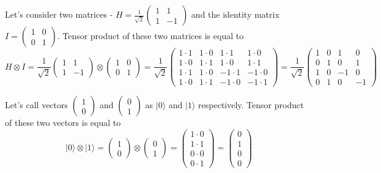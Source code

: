 \begin{example}
Let's consider two matrices - $H = \frac{1}{\sqrt{2}}\begin{pmatrix} 1 & 1 \\ 1 & -1 \end{pmatrix}$ and the identity matrix $I = \begin{pmatrix} 1 & 0 \\ 0 & 1 \end{pmatrix}$. Tensor product of these two matrices is equal to 
\[ H \otimes I = \frac{1}{\sqrt{2}}\begin{pmatrix} 1 & 1 \\ 1 & -1 \end{pmatrix} \otimes \begin{pmatrix} 1 & 0 \\ 0 & 1 \end{pmatrix} = \frac{1}{\sqrt{2}} \begin{pmatrix} 1 \cdot 1 & 1 \cdot 0 & 1 \cdot 1 & 1 \cdot 0 \\
1 \cdot 0 & 1 \cdot 1 & 1 \cdot 0 & 1 \cdot 1 \\ 1 \cdot 1 & 1 \cdot 0 & -1 \cdot 1 & -1 \cdot 0 \\ 1 \cdot 0 & 1 \cdot 1 & -1 \cdot 0 & -1 \cdot 1 \end{pmatrix} = \frac{1}{\sqrt{2}}\begin{pmatrix} 1 & 0 & 1 & 0 \\ 0 & 1 & 0 & 1 \\ 1 & 0 & -1 & 0 \\ 0 & 1 & 0 & -1 \end{pmatrix}\]
\end{example}

\begin{example}\label{example_0_1_states}
Let's call vectors $\begin{pmatrix} 1 \\ 0 \end{pmatrix}$ and $\begin{pmatrix} 0 \\ 1 \end{pmatrix}$ as $|0\rangle$ and $|1\rangle$ respectively. Tensor product of these two vectors is equal to
\[ |0\rangle \otimes |1\rangle = \begin{pmatrix} 1 \\ 0 \end{pmatrix} \otimes \begin{pmatrix} 0 \\ 1 \end{pmatrix} = \begin{pmatrix} 1 \cdot 0 \\ 1 \cdot 1 \\ 0 \cdot 0 \\ 0 \cdot 1 \end{pmatrix} = \begin{pmatrix} 0 \\ 1 \\ 0 \\ 0 \end{pmatrix}\]
\end{example}

